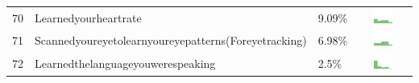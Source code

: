 \documentclass[a4paper,12pt]{article}
\begin{document}
\begin{longtable}{| p{0.5cm} | p{7cm} | p{1cm} | c |}
70 & Learnedyourheartrate & 9.09\% & \includegraphics[width = 2cm, height = 0.5cm]{learnedyourheartrateAPPSERVER} \\ 
71 & Scannedyoureyetolearnyoureyepatterns(Foreyetracking) & 6.98\% & \includegraphics[width = 2cm, height = 0.5cm]{scannedyoureyetolearnyoureyepatterns(foreyetracking)APPSERVER} \\ 
72 & Learnedthelanguageyouwerespeaking & 2.5\% & \includegraphics[width = 2cm, height = 0.5cm]{learnedthelanguageyouwerespeakingAPPSERVER} \\ 
\end{longtable}
\end{document}
